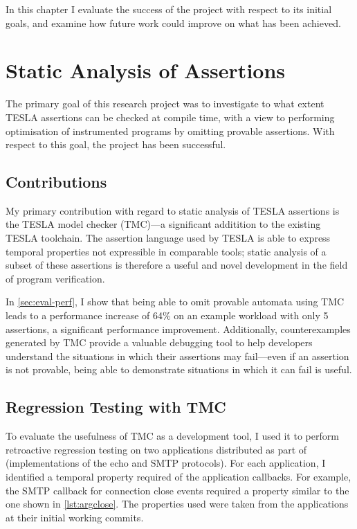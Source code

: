 In this chapter I evaluate the success of the project with respect to its
initial goals, and examine how future work could improve on what has been
achieved.

\section{Static Analysis of Assertions}

The primary goal of this research project was to investigate to what extent
TESLA assertions can be checked at compile time, with a view to performing
optimisation of instrumented programs by omitting provable assertions. With
respect to this goal, the project has been successful.

\subsection{Contributions}

My primary contribution with regard to static analysis of TESLA assertions is
the TESLA model checker (TMC)---a significant additition to the existing TESLA
toolchain. The assertion language used by TESLA is able to express temporal
properties not expressible in comparable tools; static analysis of a subset of
these assertions is therefore a useful and novel development in the field of
program verification.

In \autoref{sec:eval-perf}, I show that being able to omit provable
automata using TMC leads to a performance increase of 64\% on an example
workload with only 5 assertions, a significant performance improvement.
Additionally, counterexamples generated by TMC provide a valuable
debugging tool to help developers understand the situations in which
their assertions may fail---even if an assertion is not provable, being
able to demonstrate situations in which it can fail is useful.

\subsection{Regression Testing with TMC}

To evaluate the usefulness of TMC as a development tool, I used it to
perform retroactive regression testing on two applications distributed
as part of \lwip{} (implementations of the echo and SMTP protocols). For
each application, I identified a temporal property required of the
application callbacks. For example, the SMTP callback for connection
close events required a property similar to the one shown in
\autoref{lst:argclose}. The properties used were taken from the
applications at their initial working commits.

